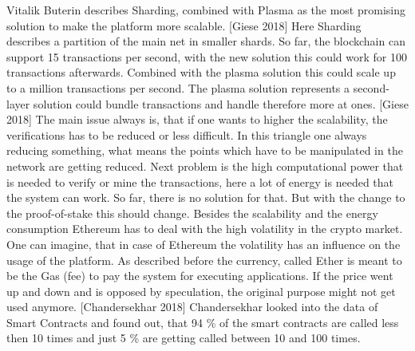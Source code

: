 Vitalik Buterin describes Sharding, combined with Plasma as the most promising solution to make the platform more scalable. [Giese 2018] Here Sharding describes a partition of the main net in smaller shards. So far, the blockchain can support 15 transactions per second, with the new solution this could work for 100 transactions afterwards. Combined with the plasma solution this could scale up to a million transactions per second. The plasma solution represents a second-layer solution could bundle transactions and handle therefore more at ones. [Giese 2018] The main issue always is, that if one wants to higher the scalability, the verifications has to be reduced or less difficult. In this triangle one always reducing something, what means the points which have to be manipulated in the network are getting reduced.
Next problem is the high computational power that is needed to verify or mine the transactions, here a lot of energy is needed that the system can work. So far, there is no solution for that. But with the change to the proof-of-stake this should change. 
Besides the scalability and the energy consumption Ethereum has to deal with the high volatility in the crypto market. One can imagine, that in case of Ethereum the volatility has an influence on the usage of the platform. As described before the currency, called Ether is meant to be the Gas (fee) to pay the system for executing applications. If the price went up and down and is opposed by speculation, the original purpose might not get used anymore. [Chandersekhar 2018] Chandersekhar looked into the data of Smart Contracts and found out, that 94 \% of the smart contracts are called less then 10 times and just 5 \% are getting called between 10 and 100 times. 
